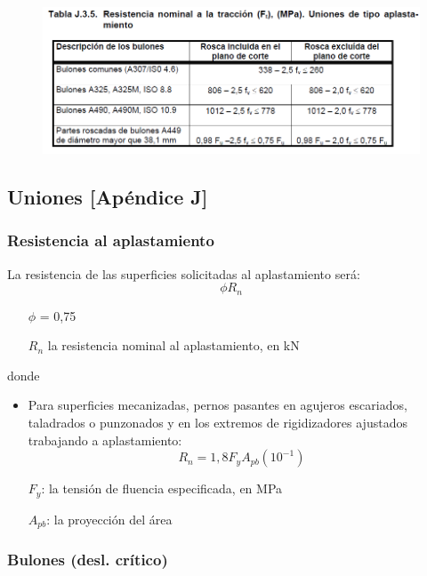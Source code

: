 \documentclass[twocolumn]{article}
\begin{document}
\begin{figure}[htb!]
	\centering
	\includegraphics[width=1.1\linewidth]{fig/tabJ35.PNG}
\end{figure}








\clearpage
\subsection{Uniones [Apéndice J]}
\subsubsection{Resistencia al aplastamiento}
La resistencia de las superficies solicitadas al aplastamiento será:
\[
\phi R_n
\]
\begin{itemize}
	\item[$\phi$] = 0,75
	\item[$R_n$] la resistencia nominal al aplastamiento, en kN
\end{itemize}
donde
\begin{itemize}
	\item Para superficies mecanizadas, pernos pasantes en agujeros escariados, taladrados
	o punzonados y en los extremos de rigidizadores ajustados trabajando a
	aplastamiento:
	\[
R_n = 1,8 F_y A_{pb} (10^{-1})
\]
\item[$F_y$:] la tensi\'on de fluencia especificada, en MPa
\item[$A_{pb}$:] la proyecci\'on del \'area
\end{itemize}
\subsubsection{Bulones (desl. crítico)}
\end{document}
